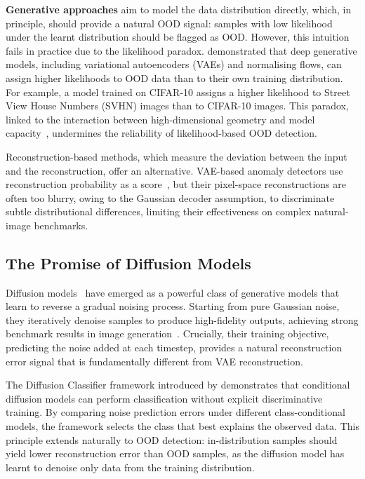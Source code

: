 \textbf{Generative approaches} aim to model the data distribution directly, which, in principle, should provide a natural OOD signal: samples with low likelihood under the learnt distribution should be flagged as OOD. However, this intuition fails in practice due to the likelihood paradox. \textcite{nalisnick2019deep} demonstrated that deep generative models, including variational autoencoders (VAEs) and normalising flows, can assign higher likelihoods to OOD data than to their own training distribution. For example, a model trained on CIFAR-10 assigns a higher likelihood to Street View House Numbers (SVHN) images than to CIFAR-10 images. This paradox, linked to the interaction between high-dimensional geometry and model capacity~\cite{kirichenko2020why}, undermines the reliability of likelihood-based OOD detection.

Reconstruction-based methods, which measure the deviation between the input and the reconstruction, offer an alternative. VAE-based anomaly detectors use reconstruction probability as a score~\cite{an2015variational}, but their pixel-space reconstructions are often too blurry, owing to the Gaussian decoder assumption, to discriminate subtle distributional differences, limiting their effectiveness on complex natural-image benchmarks.

\subsection{The Promise of Diffusion Models}
\label{sec:intro:promise}

Diffusion models~\cite{ho2020denoising, song2021score} have emerged as a powerful class of generative models that learn to reverse a gradual noising process. Starting from pure Gaussian noise, they iteratively denoise samples to produce high-fidelity outputs, achieving strong benchmark results in image generation~\cite{dhariwal2021diffusion, rombach2022highresolution}. Crucially, their training objective, predicting the noise added at each timestep, provides a natural reconstruction error signal that is fundamentally different from VAE reconstruction.

The Diffusion Classifier framework introduced by \textcite{li2023diffusion} demonstrates that conditional diffusion models can perform classification without explicit discriminative training. By comparing noise prediction errors under different class-conditional models, the framework selects the class that best explains the observed data. This principle extends naturally to OOD detection: in-distribution samples should yield lower reconstruction error than OOD samples, as the diffusion model has learnt to denoise only data from the training distribution.

